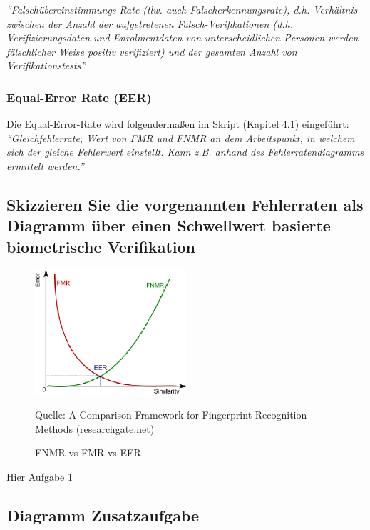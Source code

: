 \documentclass{article}
\newcommand{\figuresource}[1]{
	\begin{center}Quelle: {#1}\end{center}
}
\begin{document}
\textit{
``Falschübereinstimmungs-Rate (tlw. auch Falscherkennungsrate), d.h. Verhältnis zwischen der Anzahl der aufgetretenen Falsch-Verifikationen (d.h. Verifizierungsdaten und Enrolmentdaten von unterscheidlichen Personen werden fälschlicher Weise positiv verifiziert) und der gesamten Anzahl von Verifikationstests''
}

\subsubsection{Equal-Error Rate (EER)}

Die Equal-Error-Rate wird folgendermaßen im Skript (Kapitel 4.1) eingeführt:\\[0.1em]

\textit{
``Gleichfehlerrate, Wert von FMR und FNMR an dem Arbeitspunkt, in welchem sich der gleiche Fehlerwert einstellt. Kann z.B. anhand des Fehlerratendiagramms ermittelt werden.''
}

\subsection{Skizzieren Sie die vorgenannten Fehlerraten als Diagramm \"uber einen Schwellwert basierte biometrische Verifikation}

\begin{figure}[ht]
	\includegraphics[width=0.5\textwidth]{assets/fnmr-fmr-eer}
	\centering
	\caption{FNMR vs FMR vs EER}
	\figuresource{A Comparison Framework for Fingerprint Recognition Methods
		(\href{https://www.researchgate.net/figure/The-Relationship-between-FNMR-FMR-and-ERR_fig3_259558386}{researchgate.net})
	}
\end{figure}

Hier Aufgabe 1

\subsection{Diagramm Zusatzaufgabe}
\end{document}
